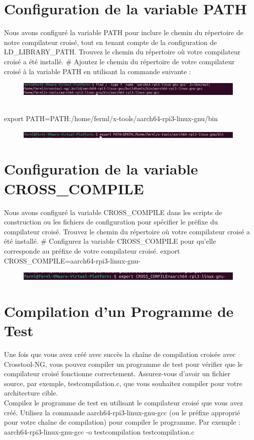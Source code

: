 \section{Configuration de la variable PATH }
Nous avons configuré la variable PATH pour inclure le chemin du répertoire de notre compilateur croisé, tout en tenant compte de la configuration de LD\_LIBRARY\_PATH.
 Trouvez le chemin du répertoire où votre compilateur croisé a été installé. # Ajoutez le chemin du répertoire de votre compilateur croisé à la variable PATH en utilisant la commande suivante :
\begin{figure}[h]
    \includegraphics[width=1\textwidth]{images/16.png}   
\end{figure}

 \\export PATH=PATH:/home/ferml/x-tools/aarch64-rpi3-linux-gnu/bin
\begin{figure}[h]
    \includegraphics[width=1\textwidth]{images/17.png}   
\end{figure}

\section{Configuration de la variable CROSS\_COMPILE}
 Nous avons configuré la variable CROSS\_COMPILE dans les scripts de construction ou les fichiers de configuration pour spécifier le préfixe du compilateur croisé.
Trouvez le chemin du répertoire où votre compilateur croisé a été installé. # Configurez la variable CROSS\_COMPILE pour qu'elle corresponde au préfixe de votre compilateur croisé. export CROSS\_COMPILE=aarch64-rpi3-linux-gnu- 

\begin{figure}[h]
    \includegraphics[width=1\textwidth]{images/19.png}   
\end{figure}
\section{Compilation d'un Programme de Test }
Une fois que vous avez créé avec succès la chaîne de compilation croisée avec Crosstool-NG, vous pouvez compiler un programme de test pour vérifier que le compilateur croisé fonctionne correctement. Assurez-vous d'avoir un fichier source, par exemple, testcompilation.c, que vous souhaitez compiler pour votre architecture cible.
\\Compilez le programme de test en utilisant le compilateur croisé que vous avez créé. Utilisez la commande aarch64-rpi3-linux-gnu-gcc (ou le préfixe approprié pour votre chaîne de compilation) pour compiler le programme. Par exemple :
\\aarch64-rpi3-linux-gnu-gcc -o testcompilation testcompilation.c 

